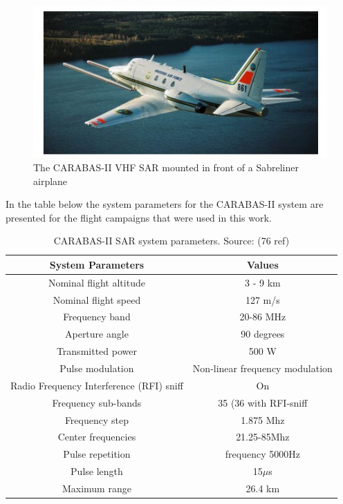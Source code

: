 \begin{figure}[h]
    \centering
    \includegraphics{chapter6/sabreliner.jpg}
    \caption{The CARABAS-II VHF SAR mounted in front of a Sabreliner airplane}
    \label{fig:sabreliner}
\end{figure}

In the table below the system parameters for the CARABAS-II system are presented for the
flight campaigns that were used in this work. 

\begin{table}[h]
    \centering
    \begin{tabular}{|c|c|}
        \hline
        System Parameters & Values \\ \hline
        Nominal flight altitude & 3 - 9 km \\ \hline
        Nominal flight speed & 127 m/s \\ \hline
        Frequency band & 20-86 MHz \\ \hline
        Aperture angle & 90 degrees \\ \hline
        Transmitted power & 500 W \\ \hline
        Pulse modulation & Non-linear frequency modulation \\ \hline
        Radio Frequency Interference (RFI) sniff & On \\ \hline
        Frequency sub-bands & 35 (36 with RFI-sniff \\ \hline
        Frequency step & 1.875 Mhz \\ \hline
        Center frequencies & 21.25-85Mhz \\ \hline
        Pulse repetition & frequency 5000Hz \\ \hline
        Pulse length & 15$\mu$s \\ \hline
        Maximum range & 26.4 km \\ \hline
    \end{tabular}
    \caption{CARABAS-II SAR system parameters. Source: (76 ref)}
    \label{tab:carabas_system}
\end{table}

